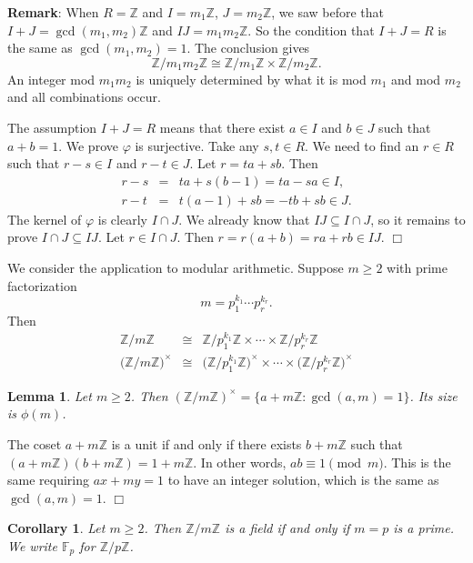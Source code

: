 \documentclass{article}
\def\Z{{\mathbb Z}}
\def\F{{\mathbb F}}
\def\Z{{\mathbb Z}}
\def\F{{\mathbb F}}
\newtheorem{cor}[subsection]{Corollary}
\newtheorem{lemma}[subsection]{Lemma}
\newenvironment{proof}{\noindent {\bf Proof:}}{$\Box$ \vspace{2 ex}}
\begin{document}
\noindent\textbf{Remark}: When $R = \Z$ and $I = m_1\Z$, $J = m_2\Z$, we saw before that $I + J = \gcd(m_1,m_2)\Z$ and $IJ = m_1m_2\Z$. So the condition that $I+J = R$ is the same as $\gcd(m_1,m_2) = 1$. The conclusion gives
$$\Z/m_1m_2\Z \cong \Z/m_1\Z \times \Z/m_2\Z.$$
An integer mod $m_1m_2$ is uniquely determined by what it is mod $m_1$ and mod $m_2$ and all combinations occur.

\vspace{5pt}
\begin{proof}
    The assumption $I + J = R$ means that there exist $a\in I$ and $b\in J$ such that $a + b = 1$. We prove $\varphi$ is surjective. Take any $s,t\in R$. We need to find an $r\in R$ such that $r - s\in I$ and $r - t\in J$. Let $r = ta + sb$. Then 
    \begin{eqnarray*}
        r - s &=& ta + s(b - 1) = ta - sa\in I,\\
        r - t &=& t(a - 1) + sb = -tb + sb \in J.
    \end{eqnarray*}
    The kernel of $\varphi$ is clearly $I\cap J$. We already know that $IJ\subseteq I\cap J$, so it remains to prove $I\cap J \subseteq IJ$. Let $r\in I\cap J$. Then $r = r(a + b) = ra + rb \in IJ$. 
\end{proof}

We consider the application to modular arithmetic. Suppose $m\geq2$ with prime factorization $$m = p_1^{k_1}\cdots p_r^{k_r}.$$
Then
\begin{eqnarray*}
    \Z/m\Z &\cong& \Z/p_1^{k_1}\Z\times\cdots\times\Z/p_r^{k_r}\Z\\
    \Big(\Z/m\Z\Big)^\times &\cong& \Big(\Z/p_1^{k_1}\Z\Big)^\times\times\cdots\times\Big(\Z/p_r^{k_r}\Z\Big)^\times
\end{eqnarray*}


\begin{lemma}
    Let $m\geq2$. Then $(\Z/m\Z)^\times = \{a + m\Z\colon \gcd(a,m) = 1\}$. Its size is $\phi(m)$.
\end{lemma}

\begin{proof}
    The coset $a + m\Z$ is a unit if and only if there exists $b + m\Z$ such that $(a+m\Z)(b+m\Z) = 1+m\Z$. In other words, $ab\equiv 1\pmod{m}$. This is the same requiring $ax + my = 1$ to have an integer solution, which is the same as $\gcd(a,m) = 1$.
\end{proof}

\begin{cor}
    Let $m\geq2$. Then $\Z/m\Z$ is a field if and only if $m = p$ is a prime. We write $\F_p$ for $\Z/p\Z$.
\end{cor}
\end{document}
